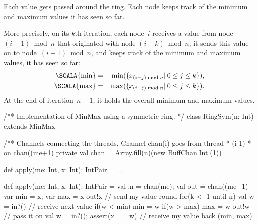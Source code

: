 \documentclass[notes,color]{sepslide0}
\def\set#1{\{#1\}}
\begin{document}

\begin{slide}

Each value gets passed around the ring.  Each node keeps track of the minimum
and maximum values it has seen so far.

More precisely, on its $k$th iteration, each node~$i$ receives a value
from node~$(i-1) \bmod n$ that originated with node $(i-k)\bmod n$; it
sends this value on to node~$(i+1)\bmod n$, and keeps track of the
minimum and maximum values,  it has seen so far:
%
\begin{eqnarray*}
\mbox{\SCALA{min}} & = & \min(\set{x_{(i-j)\bmod n} \| 0 \le j \le k}), \\
\mbox{\SCALA{max}} & = & \max(\set{x_{(i-j)\bmod n} \| 0 \le j \le k}).
\end{eqnarray*}
%
At the end of iteration~$n-1$, it holds the overall minimum and
maximum values.
\end{slide}


\begin{slide}

\begin{scala}
/** Implementation of MinMax using a symmetric ring. */
class RingSym(n: Int) extends MinMax{
  /** Channels connecting the threads.  Channel chan(i) goes from thread
    * (i-1)%
    * on chan((me+1)%
  private val chan = Array.fill(n)(new BuffChan[Int](1))

  def apply(me: Int, x: Int): IntPair = ...
}
\end{scala}
\end{slide}


\begin{slide}

\begin{scala}
  def apply(me: Int, x: Int): IntPair = {
    val in = chan(me); val out = chan((me+1)%
    var min = x; var max = x
    out!x                 // send my value round
    for(k <- 1 until n){
      val w = in?()       // receive next value
      if(w < min) min = w
      if(w > max) max = w 
      out!w               // pass it on
    }
    val w = in?(); assert(x == w) // receive my value back
    (min, max)
  }
\end{scala}
\end{slide}
\end{document}
